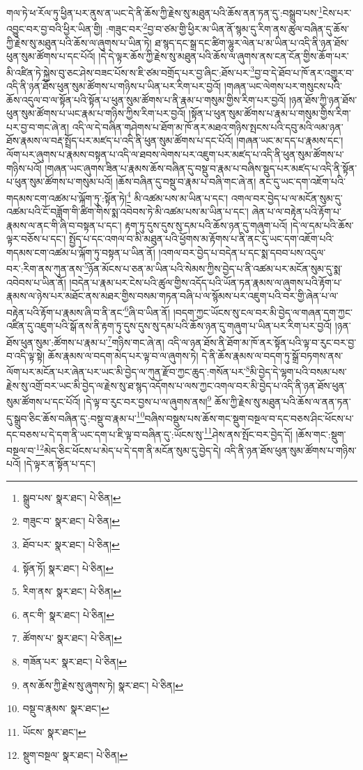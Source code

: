 གལ་ཏེ་ཕ་རོལ་ཏུ་ཕྱིན་པར་ནུས་ན་ཡང་དེ་ནི་ཆོས་ཀྱི་རྗེས་སུ་མཐུན་པའི་ཆོས་ནན་ཏན་དུ་:བསྒྲུབ་པས་\footnote{སྒྲུབ་པས་  སྣར་ཐང་།  པེ་ཅིན། }ངེས་པར་འབྱུང་བར་བྱ་བའི་ཕྱིར་ཡིན་གྱི། :གཟུང་བར་\footnote{གཟུང་བ་  སྣར་ཐང་།  པེ་ཅིན། }བྱ་བ་ཙམ་གྱི་ཕྱིར་མ་ཡིན་ནོ་སྙམ་དུ་རིག་ནས་ཚུལ་བཞིན་དུ་ཆོས་ཀྱི་རྗེས་སུ་མཐུན་པའི་ཆོས་ལ་ཞུགས་པ་ཡིན་ཏེ། ཐ་སྙད་དང་སྒྲ་དང་ཚིག་ལྷུར་ལེན་པ་མ་ཡིན་པ་འདི་ནི་ཉན་ཐོས་ཕུན་སུམ་ཚོགས་པ་དང་པོའོ། །དེ་དེ་ལྟར་ཆོས་ཀྱི་རྗེས་སུ་མཐུན་པའི་ཆོས་ལ་ཞུགས་ནས་ངན་ངོན་གྱིས་ཆོག་པར་མི་འཛིན་ཏེ་སྐྱེས་བུ་ཅང་ཤེས་བཟང་པོས་ས་ཇི་ཙམ་བགྲོད་པར་བྱ་ཞིང་:ཐོས་པར་\footnote{ཐོབ་པར་  སྣར་ཐང་།  པེ་ཅིན། }བྱ་བ་དེ་ཐོབ་པ་ཁོ་ནར་འགྱུར་བ་འདི་ནི་ཉན་ཐོས་ཕུན་སུམ་ཚོགས་པ་གཉིས་པ་ཡིན་པར་རིག་པར་བྱའོ། །གཞན་ཡང་ལེགས་པར་གསུངས་པའི་ཆོས་འདུལ་བ་ལ་སྟོན་པའི་སྟོན་པ་ཕུན་སུམ་ཚོགས་པ་ནི་རྣམ་པ་གསུམ་གྱིས་རིག་པར་བྱའོ། །ཉན་ཐོས་ཀྱི་ཉན་ཐོས་ཕུན་སུམ་ཚོགས་པ་ཡང་རྣམ་པ་གཉིས་ཀྱིས་རིག་པར་བྱའོ། །སྟོན་པ་ཕུན་སུམ་ཚོགས་པ་རྣམ་པ་གསུམ་གྱིས་རིག་པར་བྱ་བ་གང་ཞེ་ན། འདི་ལ་དེ་བཞིན་གཤེགས་པ་ཐོག་མ་ཁོ་ནར་མཐའ་གཉིས་སྤངས་པའི་དབུ་མའི་ལམ་ཉན་ཐོས་རྣམས་ལ་བརྡ་སྤྲོད་པར་མཛད་པ་འདི་ནི་ཕུན་སུམ་ཚོགས་པ་དང་པོའོ། །གཞན་ཡང་མ་དད་པ་རྣམས་དང་། ལོག་པར་ཞུགས་པ་རྣམས་བསྟན་པ་འདི་ལ་ཐབས་ལེགས་པར་འཇུག་པར་མཛད་པ་འདི་ནི་ཕུན་སུམ་ཚོགས་པ་གཉིས་པའོ། །གཞན་ཡང་ཞུགས་ཟིན་པ་རྣམས་ཆོས་བཞིན་དུ་བསྡུ་བ་རྣམ་པ་བཞིས་སྡུད་པར་མཛད་པ་འདི་ནི་སྟོན་པ་ཕུན་སུམ་ཚོགས་པ་གསུམ་པའོ། །ཆོས་བཞིན་དུ་བསྡུ་བ་རྣམ་པ་བཞི་གང་ཞེ་ན། ནང་དུ་ཡང་དག་འཇོག་པའི་གདམས་ངག་འཚམ་པ་ལྐོག་ཏུ་:སྟོན་ཏེ།\footnote{སྟོན་ཏོ།  སྣར་ཐང་།  པེ་ཅིན། } མི་འཚམ་པས་མ་ཡིན་པ་དང་། འགལ་བར་བྱེད་པ་ལ་མངོན་སུམ་དུ་འཚམ་པའི་ངོ་བཟློག་གི་ཚིག་གིས་སྨ་འབེབས་ཏེ་མི་འཚམ་པས་མ་ཡིན་པ་དང་། ཞེན་པ་ལ་བརྟེན་པའི་རྟོག་པ་རྣམས་ལ་ནང་གི་ཞི་བ་བསྟན་པ་དང་། རྟག་ཏུ་དུས་དུས་སུ་དམ་པའི་ཆོས་ཉན་དུ་གཞུག་པའོ། །དེ་ལ་དམ་པའི་ཆོས་ལྟར་བཅོས་པ་དང་། སྤྱོད་པ་དང་འགལ་བ་མི་མཐུན་པའི་ཕྱོགས་མ་རྟོགས་པ་ནི་ནང་དུ་ཡང་དག་འཇོག་པའི་གདམས་ངག་འཚམ་པ་ལྐོག་ཏུ་བསྟན་པ་ཡིན་ནོ། །འགལ་བར་བྱེད་པ་བདེན་པ་དང་སྨ་དབབ་པས་འདུལ་བར་:རིག་ནས་ཀུན་ནས་\footnote{རིག་ནས་  སྣར་ཐང་།  པེ་ཅིན། }ཉོན་མོངས་པ་ཅན་མ་ཡིན་པའི་སེམས་ཀྱིས་བྱེད་པ་ནི་འཚམ་པར་མངོན་སུམ་དུ་སྨ་འབེབས་པ་ཡིན་ནོ། །བདེན་པ་རྣམ་པར་ངེས་པའི་ཚུལ་གྱིས་འདོད་པའི་ཡོན་ཏན་རྣམས་ལ་ཞུགས་པའི་རྟོག་པ་རྣམས་ལ་ཉེས་པར་མཐོང་ནས་མཐར་གྱིས་བསམ་གཏན་བཞི་པ་ལ་སྙོམས་པར་འཇུག་པའི་བར་གྱི་ཞེན་པ་ལ་བརྟེན་པའི་རྟོག་པ་རྣམས་ཞི་བ་ནི་ནང་\footnote{ནང་གི་  སྣར་ཐང་།  པེ་ཅིན། }ཞི་བ་ཡིན་ནོ། །བདག་ཀྱང་ཡོངས་སུ་ངལ་བར་མི་བྱེད་ལ་གཞན་དག་ཀྱང་འཛིན་དུ་འཇུག་པའི་སྒོ་ནས་ནི་རྟག་ཏུ་དུས་དུས་སུ་དམ་པའི་ཆོས་ཉན་དུ་གཞུག་པ་ཡིན་པར་རིག་པར་བྱའོ། །ཉན་ཐོས་ཕུན་སུམ་:ཚོགས་པ་རྣམ་པ་\footnote{ཚོགས་པ་  སྣར་ཐང་།  པེ་ཅིན། }གཉིས་གང་ཞེ་ན། འདི་ལ་ཉན་ཐོས་ནི་ཐོག་མ་ཁོ་ནར་སྟོན་པའི་ལྟ་བ་རུང་བར་བྱ་བ་འདི་ལྟ་སྟེ། ཆོས་རྣམས་ལ་བདག་མེད་པར་ལྟ་བ་ལ་ཞུགས་ཏེ། དེ་ནི་ཆོས་རྣམས་ལ་བདག་ཏུ་སྒྲོ་བཏགས་ནས་ལོག་པར་མངོན་པར་ཞེན་པར་ཡང་མི་བྱེད་ལ་ཀུན་རྫོབ་ཀྱང་ཆུད་:གསོན་པར་\footnote{གཟོན་པར་  སྣར་ཐང་།  པེ་ཅིན། }མི་བྱེད་དེ་ལྷག་པའི་བསམ་པས་རྗེས་སུ་འགྲོ་བར་ཡང་མི་བྱེད་ལ་རྗེས་སུ་ཐ་སྙད་འདོགས་པ་ལས་ཀྱང་འགལ་བར་མི་བྱེད་པ་འདི་ནི་ཉན་ཐོས་ཕུན་སུམ་ཚོགས་པ་དང་པོའོ། །དེ་ལྟ་བ་རུང་བར་བྱས་པ་ལ་ཞུགས་ནས།\footnote{ནས་ཆོས་ཀྱི་རྗེས་སུ་ཞུགས་ཏེ།  སྣར་ཐང་།  པེ་ཅིན། } ཆོས་ཀྱི་རྗེས་སུ་མཐུན་པའི་ཆོས་ལ་ནན་ཏན་དུ་སྒྲུབ་ཅིང་ཆོས་བཞིན་དུ་:བསྡུ་བ་རྣམ་པ་\footnote{བསྡུ་བ་རྣམས་  སྣར་ཐང་། }བཞིས་བསྡུས་པས་ཆོས་གང་སྡུག་བསྔལ་བ་དང་བཅས་ཤིང་ཕོངས་པ་དང་བཅས་པ་དེ་དག་ནི་ཡང་དག་པ་ཇི་ལྟ་བ་བཞིན་དུ་:ཡོངས་སུ་\footnote{ཡོངས་  སྣར་ཐང་། }ཤེས་ནས་སྤོང་བར་བྱེད་དོ། །ཆོས་གང་:སྡུག་བསྔལ་བ་\footnote{སྡུག་བསྔལ་  སྣར་ཐང་།  པེ་ཅིན། }མེད་ཅིང་ཕོངས་པ་མེད་པ་དེ་དག་ནི་མངོན་སུམ་དུ་བྱེད་དེ། འདི་ནི་ཉན་ཐོས་ཕུན་སུམ་ཚོགས་པ་གཉིས་པའོ། །དེ་ལྟར་ན་སྟོན་པ་དང་། 